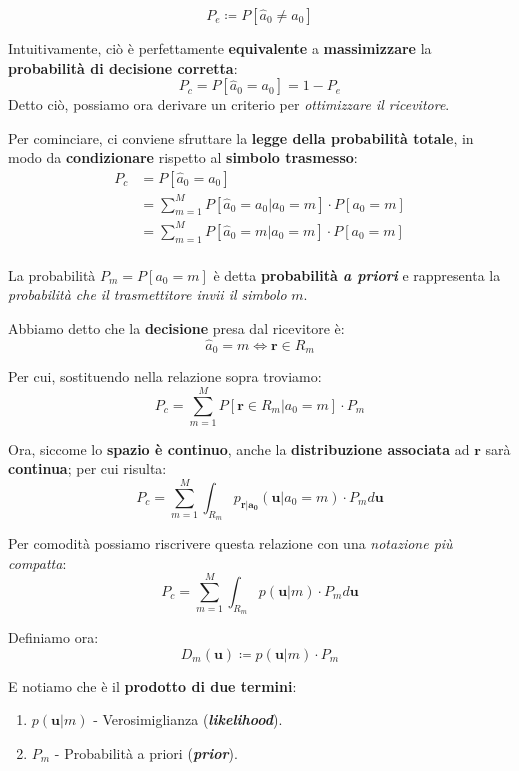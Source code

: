 \begin{definition}
    \[
        P_e \coloneqq P[\hat{a}_0 \ne a_0]
    \] 
\end{definition}

Intuitivamente, ciò è perfettamente \textbf{equivalente} a \textbf{massimizzare}
la \textbf{probabilità di decisione corretta}:
\[
    P_c = P[\hat{a}_0 = a_{0}] = 1 - P_e
\]
Detto ciò, possiamo ora derivare un criterio per \textit{ottimizzare il ricevitore}.

Per cominciare, ci conviene sfruttare la \textbf{legge della probabilità totale},
in modo da \textbf{condizionare} rispetto al \textbf{simbolo trasmesso}:
\[
    \begin{aligned}
        P_c &= P[\hat{a}_0 = a_{0}] \\ 
            &= \sum_{m=1}^M P[\hat{a}_0 = a_{0} | a_{0} = m]\cdot P[a_{0} = m] \\ 
            &= \sum_{m=1}^M P[\hat{a}_0 = m | a_{0} = m]\cdot P[a_{0} = m] \\ 
    \end{aligned}
\]

\begin{remark}
    La probabilità $P_m = P[a_{0} = m]$ è detta \textbf{probabilità \textit{a priori}} e
    rappresenta la \textit{probabilità che il trasmettitore invii il simbolo} $m$.
\end{remark}

Abbiamo detto che la \textbf{decisione} presa dal ricevitore è:
\[
    \hat{a}_0 = m \Leftrightarrow \mathbf{r} \in R_m
\]

Per cui, sostituendo nella relazione sopra troviamo:
\[
    P_c = \sum_{m=1}^M P[\mathbf{r} \in R_m | a_{0} = m]\cdot P_m
\]

Ora, siccome lo \textbf{spazio è continuo}, anche la \textbf{distribuzione associata}
ad $\mathbf{r}$ sarà \textbf{continua}; per cui risulta:
\[
    P_c = \sum_{m=1}^M \int_{R_m} p_{\mathbf{r|a_{0}}}(\mathbf{u}| a_{0} = m)\cdot P_m d\mathbf{u}
\]

Per comodità possiamo riscrivere questa relazione con una \textit{notazione più compatta}:
\[
    P_c = \sum_{m=1}^M \int_{R_m} p(\mathbf{u} | m)\cdot P_m d\mathbf{u}
\]

Definiamo ora:
\[
    D_m(\mathbf{u}) \coloneqq p(\mathbf{u} | m)\cdot P_m
\]

E notiamo che è il \textbf{prodotto di due termini}:
\begin{enumerate}
    \item $p(\mathbf{u} | m)$ - Verosimiglianza (\textbf{\textit{likelihood}}).
    \item $P_m$ - Probabilità a priori (\textbf{\textit{prior}}).
\end{enumerate}

